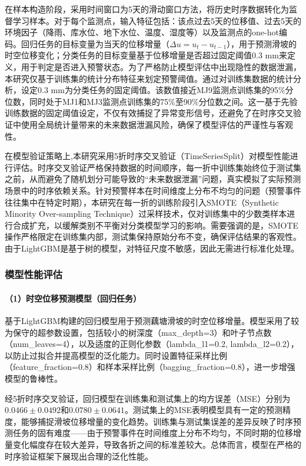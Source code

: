 \documentclass[12pt,a4paper]{article}
\begin{document}
在样本构造阶段，采用时间窗口为5天的滑动窗口方法，将历史时序数据转化为监督学习样本。对于每个监测点，输入特征包括：该点过去5天的位移值、过去5天的环境因子（降雨、库水位、地下水位、温度、湿度等）以及监测点的one-hot编码。回归任务的目标变量为当天的位移增量（$\Delta u = u_t - u_{t-1}$），用于预测滑坡的时空位移变化；分类任务的目标变量基于位移增量是否超过固定阈值0.3 mm来定义，用于判定是否进入预警状态。为了严格防止模型评估中出现隐性的数据泄漏，本研究仅基于训练集的统计分布特征来划定预警阈值。通过对训练集数据的统计分析，设定0.3 mm为分类任务的固定阈值。该数值接近MJ9监测点训练集的95\%分位数，同时处于MJ1和MJ3监测点训练集的75\%至90\%分位数之间。这一基于先验训练数据的固定阈值设定，不仅有效捕捉了异常变形信号，还避免了在时序交叉验证中使用全局统计量带来的未来数据泄漏风险，确保了模型评估的严谨性与客观性。

在模型验证策略上,本研究采用5折时序交叉验证（TimeSeriesSplit）对模型性能进行评估。时序交叉验证严格保持数据的时间顺序，每一折中训练集始终位于测试集之前，从而避免了随机划分可能导致的“未来数据泄漏”问题，真实模拟了实际预测场景中的时序依赖关系。针对预警样本在时间维度上分布不均匀的问题（预警事件往往集中在特定时期），本研究在每一折的训练阶段引入SMOTE（Synthetic Minority Over-sampling Technique）过采样技术，仅对训练集中的少数类样本进行合成扩充，以缓解类别不平衡对分类模型学习的影响。需要强调的是，SMOTE操作严格限定在训练集内部，测试集保持原始分布不变，确保评估结果的客观性。由于LightGBM是基于树的模型，对特征尺度不敏感，因此无需进行标准化处理。

\subsubsection{模型性能评估}

\paragraph{（1）时空位移预测模型（回归任务）}

\begin{sloppypar}
基于LightGBM构建的回归模型用于预测藕塘滑坡的时空位移增量。模型采用了较为保守的超参数设置，包括较小的树深度（max\_depth=3）和叶子节点数（num\_leaves=4），以及适度的正则化参数（lambda\_l1=0.2, lambda\_l2=0.2），以防止过拟合并提高模型的泛化能力。同时设置特征采样比例（feature\_fraction=0.8）和样本采样比例（bagging\_fraction=0.8），进一步增强模型的鲁棒性。
\end{sloppypar}

经5折时序交叉验证，回归模型在训练集和测试集上的均方误差（MSE）分别为$0.0466 \pm 0.0492$和$0.0780 \pm 0.0641$。测试集上的MSE表明模型具有一定的预测精度，能够捕捉滑坡位移增量的变化趋势。训练集与测试集误差的差异反映了时序预测任务的固有难度——由于预警事件在时间维度上分布不均匀，不同时期的位移增量变化幅度存在较大差异，导致各折之间的标准差较大。总体而言，模型在严格的时序验证框架下展现出合理的泛化性能。
\end{document}
